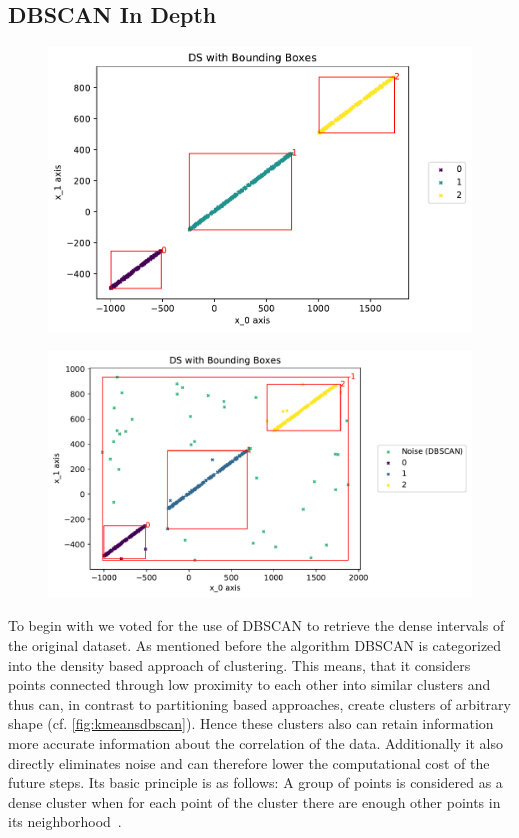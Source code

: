 \subsection{DBSCAN In Depth}
\label{ssec:DBSCANindepth}
\begin{figure}
    \centering
    \begin{minipage}{.47\textwidth}
      \centering
      \includegraphics[width=.8\textwidth]{figures/DSwithDBSCANBoundingBoxes.pdf}
      \label{fig:test1}
    \end{minipage}%
    \begin{minipage}{.53 \textwidth}
      \centering
      \includegraphics[width=.8\textwidth]{figures/DBSCANwithNoise.pdf}
      \label{fig:test2}
    \end{minipage}
\end{figure}
To begin with we voted for the use of DBSCAN to retrieve the dense intervals of the original dataset. 
As mentioned before the algorithm DBSCAN is categorized into the density based approach of clustering. This means, that it considers points connected through low proximity to each other into similar clusters and thus can, in contrast to partitioning based approaches, create clusters of arbitrary shape (cf. \autoref{fig:kmeansdbscan}). Hence these clusters also can retain information more accurate information about the correlation of the data. Additionally it also directly eliminates noise and can therefore lower the computational cost of the future steps. Its basic principle is as follows:
A group of points is considered as a dense cluster when for each point of the cluster there are enough other points in its neighborhood~\cite{DBSCANEKSX96}.

